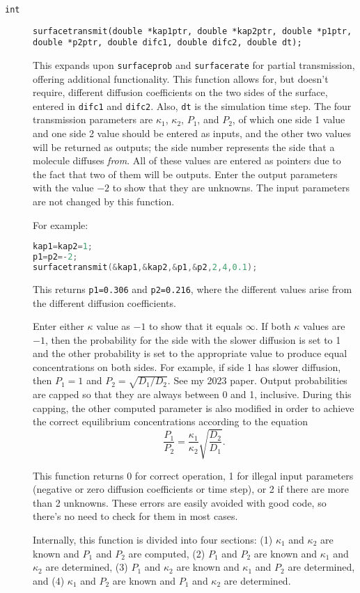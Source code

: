 \documentclass[11pt]{article}
\newcommand {\ttt} {\texttt}
\begin{document}
\begin{description}
\item[\ttt{int}]
\ttt{surfacetransmit(double *kap1ptr, double *kap2ptr, double *p1ptr, double *p2ptr, double difc1, double difc2, double dt);}

This expands upon \ttt{surfaceprob} and \ttt{surfacerate} for partial transmission, offering additional functionality. This function allows for, but doesn't require, different diffusion coefficients on the two sides of the surface, entered in \ttt{difc1} and \ttt{difc2}. Also, \ttt{dt} is the simulation time step. The four transmission parameters are $\kappa_1$, $\kappa_2$, $P_1$, and $P_2$, of which one side 1 value and one side 2 value should be entered as inputs, and the other two values will be returned as outputs; the side number represents the side that a molecule diffuses \textit{from}. All of these values are entered as pointers due to the fact that two of them will be outputs. Enter the output parameters with the value $-2$ to show that they are unknowns. The input parameters are not changed by this function.

For example:
\begin{lstlisting}[language=C]
kap1=kap2=1;
p1=p2=-2;
surfacetransmit(&kap1,&kap2,&p1,&p2,2,4,0.1);
\end{lstlisting}
This returns \ttt{p1=0.306} and \ttt{p2=0.216}, where the different values arise from the different diffusion coefficients.

Enter either $\kappa$ value as $-1$ to show that it equals $\infty$. If both $\kappa$ values are $-1$, then the probability for the side with the slower diffusion is set to 1 and the other probability is set to the appropriate value to produce equal concentrations on both sides. For example, if side 1 has slower diffusion, then $P_1=1$ and $P_2 = \sqrt{D_1 / D_2}$. See my 2023 paper. Output probabilities are capped so that they are always between 0 and 1, inclusive. During this capping, the other computed parameter is also modified in order to achieve the correct equilibrium concentrations according to the equation
$$\frac{P_1}{P_2} = \frac{\kappa_1}{\kappa_2}\sqrt{\frac{D_2}{D_1}}.$$

This function returns 0 for correct operation, 1 for illegal input parameters (negative or zero diffusion coefficients or time step), or 2 if there are more than 2 unknowns. These errors are easily avoided with good code, so there's no need to check for them in most cases.

Internally, this function is divided into four sections: (1) $\kappa_1$ and $\kappa_2$ are known and $P_1$ and $P_2$ are computed, (2) $P_1$ and $P_2$ are known and $\kappa_1$ and $\kappa_2$ are determined, (3) $P_1$ and $\kappa_2$ are known and $\kappa_1$ and $P_2$ are determined, and (4) $\kappa_1$ and $P_2$ are known and $P_1$ and $\kappa_2$ are determined.


\end{description}
\end{document}
